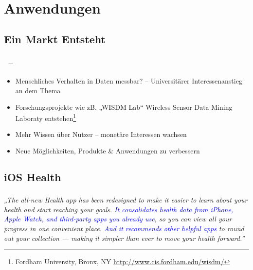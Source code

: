 \section{Anwendungen}

\subsection{Ein Markt Entsteht}

\begin{frame}
    \frametitle{\insertsubsection \ -- \cite{lockhart2011}}
    \begin{itemize}
        \setlength\itemsep{1em}
        \item Menschliches Verhalten in Daten messbar? -- Universitärer Interessenanstieg an dem Thema
        \item Forschungsprojekte wie zB. „WISDM Lab“ Wireless Sensor Data Mining Laboraty entstehen\footnote{Fordham University, Bronx, NY \url{http://www.cis.fordham.edu/wisdm/}}
        \vspace{0.7em}
        \item Mehr Wissen über Nutzer -- monetäre Interessen wachsen
        \item Neue Möglichkeiten, Produkte \& Anwendungen zu verbessern
    \end{itemize}
\end{frame}

\subsection{iOS Health}

\begin{frame}
    \frametitle{\insertsubsection}
    \center
    \Large
    \emph{„The all-new Health app has been redesigned to make it easier to learn about your health and start reaching your goals. \textcolor{blue}{It consolidates health data from iPhone, Apple Watch, and third-party apps you already use}, so you can view all your progress in one convenient place. \textcolor{blue}{And it recommends other helpful apps} to round out your collection — making it simpler than ever to move your health forward.”} \cite{iosHealth}
\end{frame}

